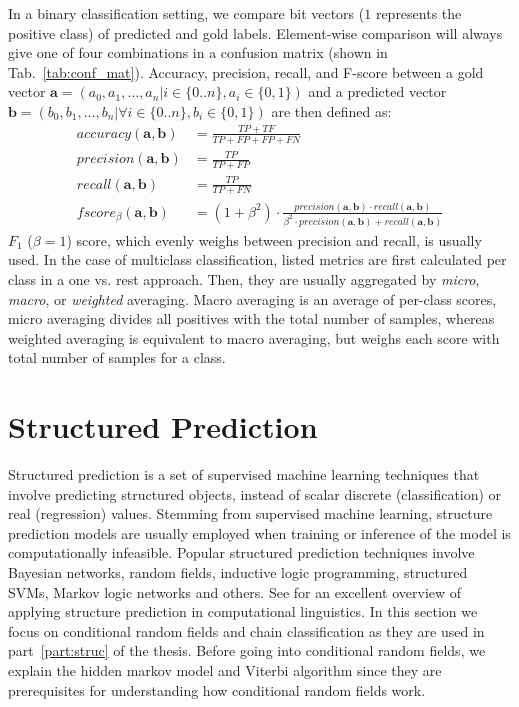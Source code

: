 In a binary classification setting, we compare bit vectors ($1$ represents the
positive class) of predicted and gold labels. Element-wise comparison will
always give one of four combinations in a confusion matrix (shown in
Tab.~\ref{tab:conf_mat}). Accuracy, precision, recall, and F-score between 
a gold vector $\mathbf{a} = (a_0, a_1, \dots, a_n | i \in \{0..n\},  a_i \in \{0, 1\})$ 
and a predicted vector 
$\mathbf{b} = (b_0, b_1, \dots, b_n | \forall i \in \{0..n\}, b_i \in \{0, 1\})$
are then defined as:
\begin{align*}
	accuracy(\mathbf{a, b}) &= \frac{TP + TF}{TP + FP + FP + FN} \\
	precision(\mathbf{a, b}) &= \frac{TP}{TP + FP} \\
	recall(\mathbf{a, b}) &= \frac{TP}{TP + FN} \\
	fscore_{\beta}(\mathbf{a, b}) &= (1 + \beta^2) 
	\cdot \frac{precision(\mathbf{a, b}) \cdot recall(\mathbf{a, b})}
	{\beta^2 \cdot precision(\mathbf{a, b}) + recall(\mathbf{a, b})}
\end{align*}
$F_1$ ($\beta = 1$) score, which evenly weighs between 
precision and recall, is usually used.
In the case of multiclass classification, listed metrics are first calculated 
per class in a one vs. rest approach. Then, they are usually 
aggregated by
\textit{micro}, \textit{macro}, or \textit{weighted} averaging. Macro
averaging is an average of per-class scores, micro
averaging divides all positives with the total number of 
samples, whereas weighted averaging is equivalent to macro averaging,
but weighs each score with total number of samples for a class. 

\section{Structured Prediction}
\label{sec:struc_machine_learning}

Structured prediction is a set of supervised machine learning techniques that
involve predicting structured objects, instead of scalar discrete
(classification) or real (regression) values.  Stemming from supervised machine
learning, structure prediction models are usually employed when training or
inference of the model is computationally infeasible.  Popular structured
prediction techniques involve Bayesian networks, random fields, inductive logic
programming, structured SVMs, Markov logic networks and others.  See
\citep{smith2011linguistic} for an excellent overview of applying structure
prediction in computational linguistics.  In this section we focus on
conditional random fields and chain classification as they are used in
part~\ref{part:struc} of the thesis. Before going into  conditional random
fields, we explain the hidden markov model and Viterbi algorithm since they are
prerequisites for understanding how conditional random fields work.

